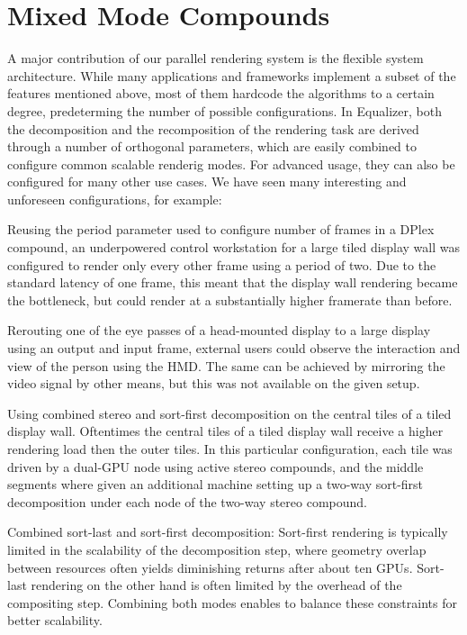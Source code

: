 \section{Mixed Mode Compounds}

A major contribution of our parallel rendering system is the flexible system
architecture. While many applications and frameworks implement a subset of the
features mentioned above, most of them hardcode the algorithms to a certain
degree, predeterming the number of possible configurations. In Equalizer, both
the decomposition and the recomposition of the rendering task are derived
through a number of orthogonal parameters, which are easily combined to
configure common scalable renderig modes. For advanced usage, they can also be
configured for many other use cases. We have seen many interesting and
unforeseen configurations, for example:

\begin{compactitem}

\item Reusing the \textsf{period} parameter used to configure number of frames
in a DPlex compound, an underpowered control workstation for a large tiled
display wall was configured to render only every other frame using a period of
two. Due to the standard latency of one frame, this meant that the display wall
rendering became the bottleneck, but could render at a substantially higher
framerate than before.

\item Rerouting one of the eye passes of a head-mounted display to a large
display using an output and input frame, external users could observe the
interaction and view of the person using the HMD. The same can be achieved by
mirroring the video signal by other means, but this was not available on the
given setup.

\item Using combined stereo and sort-first decomposition on the central tiles of
a tiled display wall. Oftentimes the central tiles of a tiled display wall
receive a higher rendering load then the outer tiles. In this particular
configuration, each tile was driven by a dual-GPU node using active stereo
compounds, and the middle segments where given an additional machine setting up
a two-way sort-first decomposition under each node of the two-way stereo
compound.

\item Combined sort-last and sort-first decomposition: Sort-first rendering is
typically limited in the scalability of the decomposition step, where geometry
overlap between resources often yields diminishing returns after about ten
GPUs. Sort-last rendering on the other hand is often limited by the overhead of
the compositing step. Combining both modes enables to balance these constraints
for better scalability.

\end{compactitem}

